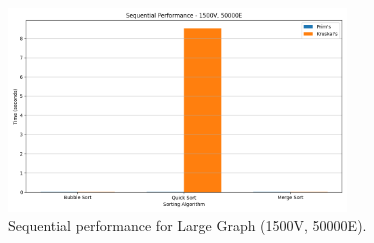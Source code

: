 \documentclass[11pt]{article}
\begin{document}
\begin{figure}[H]
    \centering
    \includegraphics[width=0.8\textwidth]{sequential_large}
    \caption{Sequential performance for Large Graph (1500V, 50000E).}
    \label{fig:sequential_large}
\end{figure}
\end{document}
